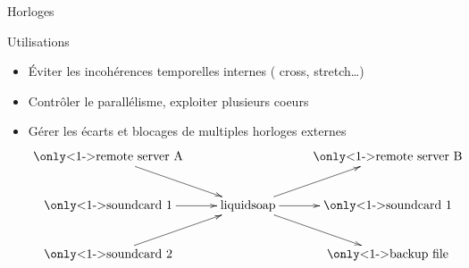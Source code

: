\documentclass{beamer}
\newcommand{\kw}[1]{{\color{red} #1}}
\begin{document}
\begin{frame}{Horloges}

\begin{block}{Utilisations}
\begin{itemize}
\item \'Eviter les incohérences temporelles internes
   (\kw{cross}, \kw{stretch}\ldots)
\item Contrôler le parallélisme, exploiter plusieurs coeurs
\item Gérer les écarts et blocages de multiples horloges externes
\[
\xymatrix{
  \text{\only<1->{\color{red}}remote server A} \ar[dr] &
        & \mbox{\only<1->{\color{gray}}remote server B} \\
  \text{\only<1->{\color{blue}}soundcard 1} \ar[r]      &
                \text{liquidsoap} \ar[ur]\ar[r]\ar[dr]
        & \mbox{\only<1->{\color{blue}}soundcard 1}     \\
  \text{\only<1->{\color{green}}soundcard 2} \ar[ur] &
        & \mbox{\only<1->{\color{blue}}backup file}
}
\]
\end{itemize}
\end{block}

\end{frame}

\end{document}
